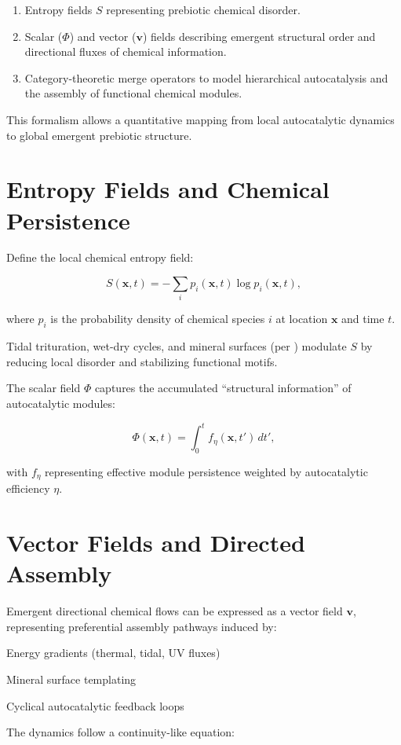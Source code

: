 \documentclass{book}
\begin{document}
\begin{enumerate}
\item Entropy fields $S$ representing prebiotic chemical disorder.
\item Scalar ($\Phi$) and vector ($\mathbf{v}$) fields describing emergent structural order and directional fluxes of chemical information.
\item Category-theoretic merge operators to model hierarchical autocatalysis and the assembly of functional chemical modules.
\end{enumerate}

This formalism allows a quantitative mapping from local autocatalytic dynamics to global emergent prebiotic structure.

\section{Entropy Fields and Chemical Persistence}
Define the local chemical entropy field:

\[S(\mathbf{x}, t) = - \sum_i p_i(\mathbf{x}, t) \log p_i(\mathbf{x}, t),\]

where $p_i$ is the probability density of chemical species $i$ at location $\mathbf{x}$ and time $t$.

Tidal trituration, wet-dry cycles, and mineral surfaces (per \citealt{hazen2005}) modulate $S$ by reducing local disorder and stabilizing functional motifs.

The scalar field $\Phi$ captures the accumulated “structural information” of autocatalytic modules:

\[\Phi(\mathbf{x}, t) = \int_0^t f_\eta(\mathbf{x}, t') \, dt',\]

with $f_\eta$ representing effective module persistence weighted by autocatalytic efficiency $\eta$.

\section{Vector Fields and Directed Assembly}
Emergent directional chemical flows can be expressed as a vector field $\mathbf{v}$, representing preferential assembly pathways induced by:

Energy gradients (thermal, tidal, UV fluxes)

Mineral surface templating \citep{hazen2005}

Cyclical autocatalytic feedback loops

The dynamics follow a continuity-like equation:
\end{document}
